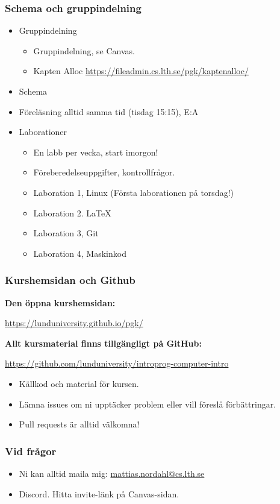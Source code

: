 \begin{frame}[fragile=singleslide]
	\frametitle{Schema och gruppindelning}

	\begin{itemize}
		\item Gruppindelning
		      \begin{itemize}
			      \item Gruppindelning, se Canvas.
			      \item Kapten Alloc \url{https://fileadmin.cs.lth.se/pgk/kaptenalloc/}
		      \end{itemize}
		\item Schema
		\item Föreläsning alltid samma tid (tisdag 15:15), E:A
		\item Laborationer
		      \begin{itemize}
			      \item En labb per vecka, start imorgon!
			      \item Föreberedelseuppgifter, kontrollfrågor.
			      \item Laboration 1, Linux (Första laborationen på torsdag!)
			      \item Laboration 2. \LaTeX
			      \item Laboration 3, Git
			      \item Laboration 4, Maskinkod
		      \end{itemize}
	\end{itemize}
\end{frame}



\begin{frame}[fragile=singleslide]
	\frametitle{Kurshemsidan och Github}

		{\bf Den öppna kurshemsidan:}

		\smallskip
		\small\url{https://lunduniversity.github.io/pgk/}
		
		
		\bigskip
		
		
		{\bf Allt kursmaterial finns tillgängligt på GitHub:}

		\smallskip
		\small\url{https://github.com/lunduniversity/introprog-computer-intro}
		
		\smallskip
		\begin{itemize}
			\item Källkod och material för kursen.
			\item Lämna issues om ni upptäcker problem eller vill föreslå förbättringar.
			\item Pull requests är alltid välkomna!
		\end{itemize}
\end{frame}

\begin{frame}[fragile=singleslide]
	\frametitle{Vid frågor}

	\begin{itemize}
		\item Ni kan alltid maila mig: \url{mattias.nordahl@cs.lth.se}
		\item Discord. Hitta invite-länk på Canvas-sidan.
	\end{itemize}
\end{frame}